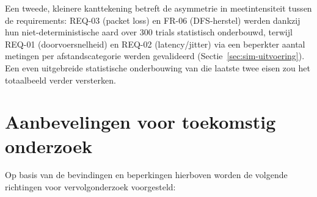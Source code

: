 Een tweede, kleinere kanttekening betreft de asymmetrie in meetintensiteit tussen de
requirements: REQ-03 (packet loss) en FR-06 (DFS-herstel) werden dankzij hun
niet-deterministische aard over 300 trials statistisch onderbouwd, terwijl REQ-01
(doorvoersnelheid) en REQ-02 (latency/jitter) via een beperkter aantal metingen per
afstandscategorie werden gevalideerd (Sectie~\ref{sec:sim-uitvoering}). Een even
uitgebreide statistische onderbouwing van die laatste twee eisen zou het totaalbeeld
verder versterken.
 
\section{Aanbevelingen voor toekomstig onderzoek}%
\label{sec:conclusie-verder-onderzoek}
 
Op basis van de bevindingen en beperkingen hierboven worden de volgende richtingen voor
vervolgonderzoek voorgesteld:
 
